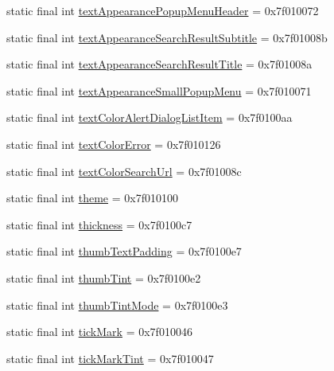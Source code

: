\begin{CompactItemize}
static final int \hyperlink{classandroid_1_1support_1_1v7_1_1palette_1_1_r_1_1attr_d376d437506a05e8d71a3a87b9b5fa4c}{textAppearancePopupMenuHeader} = 0x7f010072
\item 
static final int \hyperlink{classandroid_1_1support_1_1v7_1_1palette_1_1_r_1_1attr_28543e8a8815f1450bc5f3118786a417}{textAppearanceSearchResultSubtitle} = 0x7f01008b
\item 
static final int \hyperlink{classandroid_1_1support_1_1v7_1_1palette_1_1_r_1_1attr_46088c84c7ecc3871d3207e7e556fde0}{textAppearanceSearchResultTitle} = 0x7f01008a
\item 
static final int \hyperlink{classandroid_1_1support_1_1v7_1_1palette_1_1_r_1_1attr_d48a46f661013fc1dae8f0eb41d96802}{textAppearanceSmallPopupMenu} = 0x7f010071
\item 
static final int \hyperlink{classandroid_1_1support_1_1v7_1_1palette_1_1_r_1_1attr_068933e235e4b5e7fe0ff81b4aaf772b}{textColorAlertDialogListItem} = 0x7f0100aa
\item 
static final int \hyperlink{classandroid_1_1support_1_1v7_1_1palette_1_1_r_1_1attr_20d85588e17c59c529d5e54589e3ca3b}{textColorError} = 0x7f010126
\item 
static final int \hyperlink{classandroid_1_1support_1_1v7_1_1palette_1_1_r_1_1attr_a345bae544e67896e14403c4cf3bd386}{textColorSearchUrl} = 0x7f01008c
\item 
static final int \hyperlink{classandroid_1_1support_1_1v7_1_1palette_1_1_r_1_1attr_3f57d39e54c1dc4c98baef5f96acb4bb}{theme} = 0x7f010100
\item 
static final int \hyperlink{classandroid_1_1support_1_1v7_1_1palette_1_1_r_1_1attr_1eb255fca4eefdd13f65d0ab7c9a4d27}{thickness} = 0x7f0100c7
\item 
static final int \hyperlink{classandroid_1_1support_1_1v7_1_1palette_1_1_r_1_1attr_48660ce81abe137e3b85196fa53a0602}{thumbTextPadding} = 0x7f0100e7
\item 
static final int \hyperlink{classandroid_1_1support_1_1v7_1_1palette_1_1_r_1_1attr_34dd0419798e8ef9241a602c8092b1f4}{thumbTint} = 0x7f0100e2
\item 
static final int \hyperlink{classandroid_1_1support_1_1v7_1_1palette_1_1_r_1_1attr_bc38e4af333f56fffc00852dc27c895c}{thumbTintMode} = 0x7f0100e3
\item 
static final int \hyperlink{classandroid_1_1support_1_1v7_1_1palette_1_1_r_1_1attr_0fac2029a84f12c8bd4f9d56369bb25a}{tickMark} = 0x7f010046
\item 
static final int \hyperlink{classandroid_1_1support_1_1v7_1_1palette_1_1_r_1_1attr_4bcf5eb0d8bda060ae70e05cb5bc44f0}{tickMarkTint} = 0x7f010047

\end{CompactItemize}
